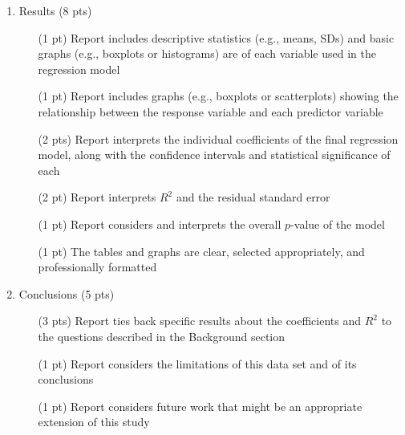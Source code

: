 \documentclass[12pt]{article}
\begin{document}
\begin{enumerate}
\begin{enumerate}
    \item Results (8 pts)
      \begin{enumerate}
        \item[(1 pt)] Report includes descriptive statistics (e.g., means, SDs) and basic graphs (e.g., boxplots or histograms) are of each variable used in the regression model
        \item[(1 pt)] Report includes graphs (e.g., boxplots or scatterplots) showing the relationship between the response variable and each predictor variable
        \item[(2 pts)] Report interprets the individual coefficients of the final regression model, along with the confidence intervals and statistical significance of each
        \item[(2 pt)] Report interprets $R^2$ and the residual standard error
        \item[(1 pt)] Report considers and interprets the overall $p$-value of the model
        \item[(1 pt)] The tables and graphs are clear, selected appropriately, and professionally formatted
      \end{enumerate}

    \item Conclusions (5 pts)
      \begin{enumerate}
        \item[(3 pts)] Report ties back specific results about the coefficients and $R^2$ to the questions described in the Background section
        \item[(1 pt)] Report considers the limitations of this data set and of its conclusions
        \item[(1 pt)] Report considers future work that might be an appropriate extension of this study
      \end{enumerate}
  \end{enumerate}
\end{enumerate}
\end{document}

